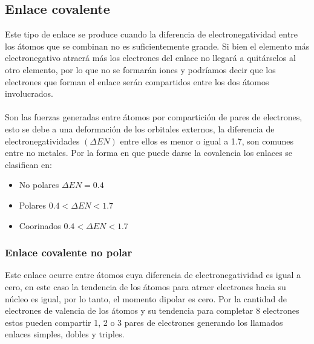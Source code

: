 \documentclass[12pt]{article}
\begin{document}
               \subsection{Enlace covalente}\label{sec:Enlace covalente}
                    Este tipo de enlace se produce cuando la diferencia de electronegatividad entre los átomos que se combinan no es suficientemente grande. Si bien el elemento más electronegativo atraerá más los electrones del enlace no llegará a quitárselos al otro elemento, por lo que no se formarán iones y podríamos decir que los electrones que forman el enlace serán compartidos entre los dos átomos involucrados.\\\\
                    Son las fuerzas generadas entre átomos por compartición de pares de electrones, esto se debe a una deformación de los orbitales externos, la diferencia de electronegatividades $(\Delta EN)$ entre ellos es menor o igual a 1.7, son comunes entre no metales. Por la forma en que puede darse la covalencia los enlaces se clasifican en:

                    \begin{itemize}
                         \item No polares $\Delta EN = 0.4$
                         \item Polares $0.4 < \Delta EN < 1.7$
                         \item Coorinados $0.4 < \Delta EN < 1.7$
                    \end{itemize}

                    \subsubsection{Enlace covalente no polar}\label{sec:Enlace covalente no polar}
                         Este enlace ocurre entre átomos cuya diferencia de electronegatividad es igual a cero, en este caso la tendencia de los átomos para atraer electrones hacia su núcleo es igual, por lo tanto, el momento dipolar es cero. Por la cantidad de electrones de valencia de los átomos y su tendencia para completar 8 electrones estos pueden compartir 1, 2 o 3 pares de electrones generando los llamados enlaces simples, dobles y triples.
\end{document}
